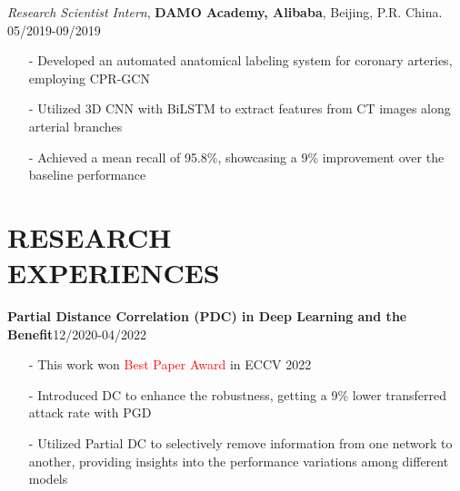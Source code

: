 \documentclass[margin]{res}
\begin{document}
\begin{resume}
                \vspace{-1em}  
                
                {\it Research Scientist Intern}, \textbf{DAMO Academy, Alibaba}, Beijing, P.R. China. \hfill 05/2019-09/2019
                \begin{itemize}\itemsep -2.2pt %
                 \item[-] Developed an automated anatomical labeling system for coronary arteries, employing CPR-GCN
                 \item[-] Utilized 3D CNN with BiLSTM to extract features from CT images along arterial branches
                 \item[-] Achieved a mean recall of 95.8\%, showcasing a 9\% improvement over the baseline performance
                 \end{itemize}

\vspace{-1em}
\section{RESEARCH \\ EXPERIENCES}
				\textbf{Partial Distance Correlation (PDC) in Deep Learning and the Benefit}\hfill 12/2020-04/2022
                \begin{itemize}\itemsep -2.2pt %
                \item[-] This work won {\textcolor{red}{Best Paper Award}} in ECCV 2022
                 \item[-] Introduced DC to enhance the robustness, getting a 9\% lower transferred attack rate with PGD
                 \item[-] Utilized Partial DC to selectively remove information from one network to another, providing insights into the performance variations among different models
                 \end{itemize}


\end{resume}
\end{document}
